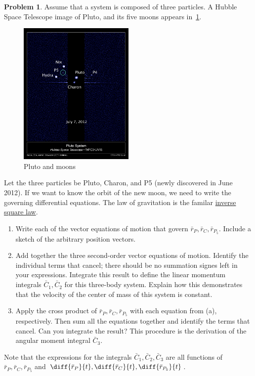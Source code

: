 \documentclass[10pt]{article}
\theoremstyle{definition}
\newtheorem{prob}{Problem}[section]
\newenvironment{subprob}%
{\renewcommand{\theenumi}{\alph{enumi}}\renewcommand{\labelenumi}{(\theenumi)}\begin{enumerate}}%
{\end{enumerate}}%
\begin{document}
\begin{prob}
    Assume  that  a system is composed of three particles.
    A Hubble Space Telescope image of Pluto, and its five moons appears in~\cref{fig:pluto}.
    \begin{figure}[htbp]
        \centering
        \includegraphics[trim={10cm 50cm 10cm 20cm},clip,width=0.5\textwidth]{figures/pluto.jpg}
        \caption{Pluto and moons~\label{fig:pluto}}
    \end{figure}
    Let the three particles be Pluto, Charon, and P5 (newly discovered in June 2012).
    If we want to know the orbit of the new moon, we need to write the governing differential equations.
    The law of gravitation is the familar \underline{inverse square law}.

    \begin{subprob}
        \item Write each of the vector equations of motion that govern \( \bar r_P, \bar r_C, \bar r_{P_5} \).
            Include a sketch of the arbitrary position vectors.
        \item Add together the three second-order vector equations of motion. 
            Identify the individual terms that cancel; there should be no summation signes left in your expressions.
            Integrate this result to define the linear momentum integrals \( \bar C_1 , \bar C_2 \) for this three-body  system.
            Explain how this demonstrates that the velocity of the center of mass of this system is constant.
        \item Apply the cross product of \( \bar r_P, \bar r_C, \bar r_{P_5} \) with each equation from (a), respectively. 
            Then sum all the equations together and identify the terms that cancel. 
            Can you integrate the result?
            This procedure is the derivation of the angular moment integral \( \bar C_3\).
    \end{subprob}

    Note that the expressions for the integrals \( \bar C_1, \bar C_2, \bar C_3 \) are all functions of \( \bar r_P, \bar r_C, \bar r_{P_5} \) and \( \diff{\bar r_P}{t}, \diff{\bar r_C}{t}, \diff{\bar r_{P_5}}{t}\).
\end{prob}
\end{document}
